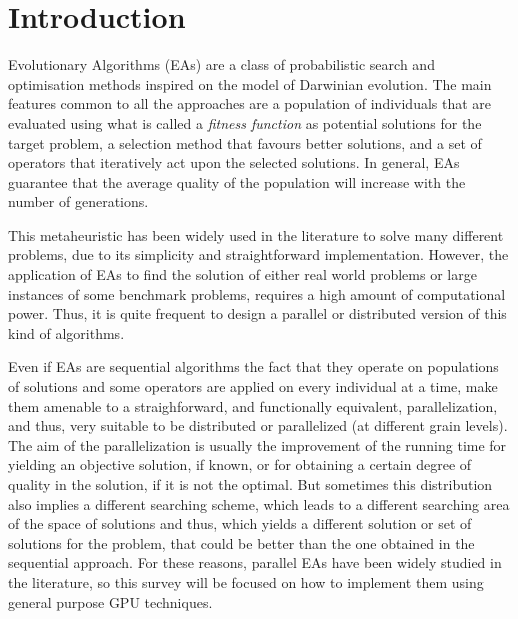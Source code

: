 \documentclass{article}
\begin{document}
%


\section{Introduction}
\label{sec:intro}

Evolutionary Algorithms (EAs) \cite{EAs_Back96} are a class of
probabilistic search and optimisation methods inspired on the model of
Darwinian evolution.  The main features common to all the approaches
are a population of individuals that are evaluated using what is
called a {\em fitness function} as potential solutions for the target
problem, a selection method that favours better solutions, and a set
of operators that iteratively act upon the selected solutions. In
general, EAs guarantee that the average quality of
the population will increase with the number of generations.

This metaheuristic has been widely used in the literature to solve
many different problems, due to its simplicity and straightforward
implementation. However, the application of EAs to find the solution
of either real world problems or large instances of some benchmark
problems, requires a high amount of computational power. Thus, it is
quite frequent to design a parallel or distributed version of this
kind of algorithms. %

Even if EAs are sequential algorithms the fact that they operate on
populations of solutions and some operators are applied on every individual at a time,
make them amenable to a straighforward, and functionally equivalent,
parallelization, and thus, very suitable
to be distributed or parallelized (at different grain levels). 
The aim of the parallelization is usually the improvement of the
running time for yielding an objective solution, if known, or for
obtaining a certain degree of quality in the solution, if it is not
the optimal. But sometimes this distribution also implies a different
searching scheme, which leads to a different searching area of the
space of solutions and thus, which yields a different solution or set
of solutions for the problem, that could be better than the one
obtained in the sequential approach. 
For these reasons, parallel EAs have been widely studied in the
literature, so this survey will be focused on how to implement them
using general purpose GPU techniques. 
\end{document}
